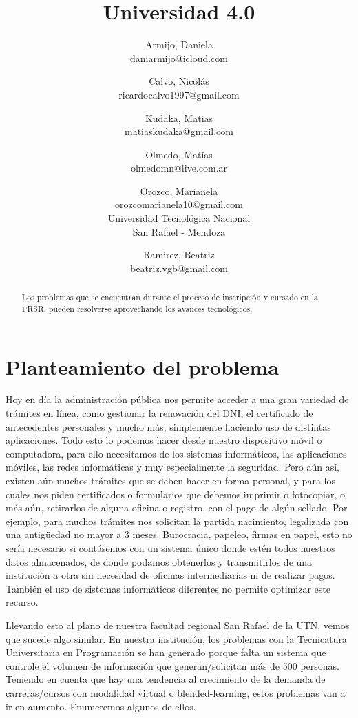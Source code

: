 \documentclass[a4paper]{article}
\title{Universidad 4.0}
\author{Armijo, Daniela\\
  \small daniarmijo@icloud.com
  \and
  Calvo, Nicolás\\
  \small ricardocalvo1997@gmail.com
  \and
  Kudaka, Matias\\
  \small matiaskudaka@gmail.com
  \and
  Olmedo, Matías\\
  \small olmedomn@live.com.ar
  \and
  Orozco, Marianela\\
  \small orozcomarianela10@gmail.com\\
  \small Universidad Tecnológica Nacional\\
  \small San Rafael - Mendoza
  \and
  Ramirez, Beatriz\\
  \small beatriz.vgb@gmail.com\\
  \date{}
}
\begin{document}
\maketitle

\maketitle
\begin{abstract}
Los problemas que se encuentran durante el proceso de inscripción y cursado en la FRSR, pueden resolverse aprovechando los avances tecnológicos.
\end{abstract}


\section{Planteamiento del problema}

Hoy en día la administración pública nos permite acceder a una gran variedad de trámites en línea, como gestionar la renovación del DNI, el certificado de antecedentes personales y mucho más, simplemente haciendo uso de distintas aplicaciones. Todo esto lo podemos hacer desde nuestro dispositivo móvil o computadora, para ello necesitamos de los sistemas informáticos, las aplicaciones móviles, las redes informáticas y muy especialmente la seguridad. Pero aún así, existen aún muchos trámites que se deben hacer en forma personal, y para los cuales nos piden certificados o formularios que debemos imprimir o fotocopiar, o más aún, retirarlos de alguna oficina o registro, con el pago de algún sellado. Por ejemplo, para muchos trámites nos solicitan la partida nacimiento, legalizada con una antigüedad no mayor a 3 meses. Burocracia, papeleo, firmas en papel, esto no sería necesario si contásemos con un sistema único donde estén todos nuestros datos almacenados, de donde podamos obtenerlos y transmitirlos de una institución a otra sin necesidad de oficinas intermediarias ni de realizar pagos. También el uso de sistemas informáticos diferentes no permite optimizar este recurso. 

Llevando esto al plano de nuestra facultad regional San Rafael de la UTN, vemos que sucede algo similar. En nuestra institución, los problemas con la Tecnicatura Universitaria en Programación se han generado porque falta un sistema que controle el volumen de información que generan/solicitan más de 500 personas. Teniendo en cuenta que hay una tendencia al crecimiento de la demanda de carreras/cursos con modalidad virtual o blended-learning, estos problemas van a ir en aumento. Enumeremos algunos de ellos.
\end{document}
